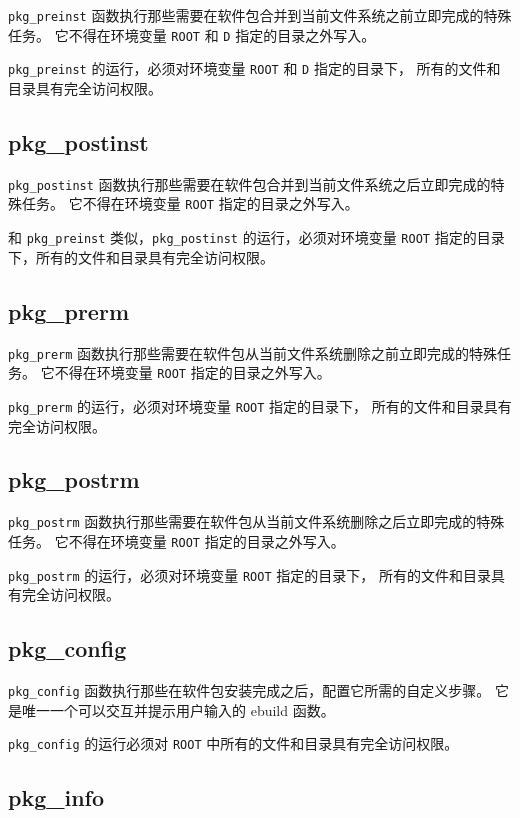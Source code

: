\texttt{pkg_preinst} 函数执行那些需要在软件包合并到当前文件系统之前立即完成的特殊任务。
它不得在环境变量 \texttt{ROOT} 和 \texttt{D} 指定的目录之外写入。

\texttt{pkg_preinst} 的运行，必须对环境变量 \texttt{ROOT} 和 \texttt{D} 指定的目录下，
所有的文件和目录具有完全访问权限。

\subsection{pkg_postinst}

\texttt{pkg_postinst} 函数执行那些需要在软件包合并到当前文件系统之后立即完成的特殊任务。
它不得在环境变量 \texttt{ROOT} 指定的目录之外写入。

和 \texttt{pkg_preinst} 类似，\texttt{pkg_postinst} 的运行，必须对环境变量 \texttt{ROOT}
指定的目录下，所有的文件和目录具有完全访问权限。

\subsection{pkg_prerm}

\texttt{pkg_prerm} 函数执行那些需要在软件包从当前文件系统删除之前立即完成的特殊任务。
它不得在环境变量 \texttt{ROOT} 指定的目录之外写入。

\texttt{pkg_prerm} 的运行，必须对环境变量 \texttt{ROOT} 指定的目录下，
所有的文件和目录具有完全访问权限。

\subsection{pkg_postrm}

\texttt{pkg_postrm} 函数执行那些需要在软件包从当前文件系统删除之后立即完成的特殊任务。
它不得在环境变量 \texttt{ROOT} 指定的目录之外写入。

\texttt{pkg_postrm} 的运行，必须对环境变量 \texttt{ROOT} 指定的目录下，
所有的文件和目录具有完全访问权限。

\subsection{pkg_config}

\texttt{pkg_config} 函数执行那些在软件包安装完成之后，配置它所需的自定义步骤。
它是唯一一个可以交互并提示用户输入的 ebuild 函数。

\texttt{pkg_config} 的运行必须对 \texttt{ROOT} 中所有的文件和目录具有完全访问权限。

\subsection{pkg_info}


